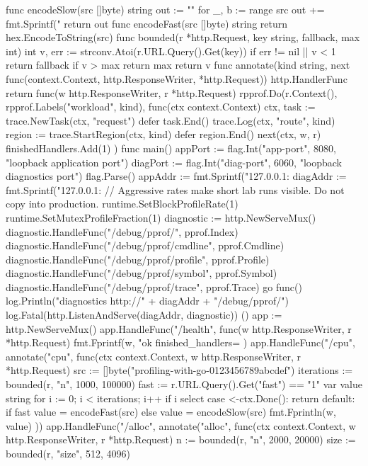 \documentclass[UTF8,fontset=fandol,openany,11pt]{ctexbook}
\begin{document}
\begin{codeblock}
func encodeSlow(src []byte) string {
	out := ""
	for _, b := range src {
		out += fmt.Sprintf("%
	}
	return out
}
func encodeFast(src []byte) string { return hex.EncodeToString(src) }
func bounded(r *http.Request, key string, fallback, max int) int {
	v, err := strconv.Atoi(r.URL.Query().Get(key))
	if err != nil || v < 1 {
		return fallback
	}
	if v > max {
		return max
	}
	return v
}
func annotate(kind string, next func(context.Context, http.ResponseWriter, *http.Request)) http.HandlerFunc {
	return func(w http.ResponseWriter, r *http.Request) {
		rpprof.Do(r.Context(), rpprof.Labels("workload", kind), func(ctx context.Context) {
			ctx, task := trace.NewTask(ctx, "request")
			defer task.End()
			trace.Log(ctx, "route", kind)
			region := trace.StartRegion(ctx, kind)
			defer region.End()
			next(ctx, w, r)
			finishedHandlers.Add(1)
		})
	}
}
func main() {
	appPort := flag.Int("app-port", 8080, "loopback application port")
	diagPort := flag.Int("diag-port", 6060, "loopback diagnostics port")
	flag.Parse()
	appAddr := fmt.Sprintf("127.0.0.1:%
	diagAddr := fmt.Sprintf("127.0.0.1:%
	// Aggressive rates make short lab runs visible. Do not copy into production.
	runtime.SetBlockProfileRate(1)
	runtime.SetMutexProfileFraction(1)
	diagnostic := http.NewServeMux()
	diagnostic.HandleFunc("/debug/pprof/", pprof.Index)
	diagnostic.HandleFunc("/debug/pprof/cmdline", pprof.Cmdline)
	diagnostic.HandleFunc("/debug/pprof/profile", pprof.Profile)
	diagnostic.HandleFunc("/debug/pprof/symbol", pprof.Symbol)
	diagnostic.HandleFunc("/debug/pprof/trace", pprof.Trace)
	go func() {
		log.Println("diagnostics http://" + diagAddr + "/debug/pprof/")
		log.Fatal(http.ListenAndServe(diagAddr, diagnostic))
	}()
	app := http.NewServeMux()
	app.HandleFunc("/health", func(w http.ResponseWriter, r *http.Request) {
		fmt.Fprintf(w, "ok finished_handlers=%
	})
	app.HandleFunc("/cpu", annotate("cpu", func(ctx context.Context, w http.ResponseWriter, r *http.Request) {
		src := []byte("profiling-with-go-0123456789abcdef")
		iterations := bounded(r, "n", 1000, 100000)
		fast := r.URL.Query().Get("fast") == "1"
		var value string
		for i := 0; i < iterations; i++ {
			if i%
				select {
				case <-ctx.Done():
					return
				default:
				}
			}
			if fast {
				value = encodeFast(src)
			} else {
				value = encodeSlow(src)
			}
		}
		fmt.Fprintln(w, value)
	}))
	app.HandleFunc("/alloc", annotate("alloc", func(ctx context.Context, w http.ResponseWriter, r *http.Request) {
		n := bounded(r, "n", 2000, 20000)
		size := bounded(r, "size", 512, 4096)
}
\end{codeblock}
\end{document}
